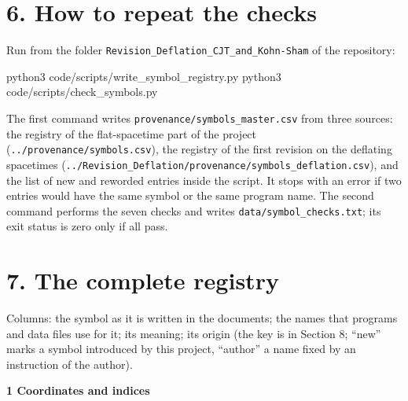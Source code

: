 \documentclass[
  10pt,
]{article}
\newenvironment{Shaded}{}{}
\newcommand{\ExtensionTok}[1]{#1}
\newcommand{\NormalTok}[1]{#1}
\begin{document}
\hypertarget{how-to-repeat-the-checks}{%
\section{6. How to repeat the checks}\label{how-to-repeat-the-checks}}

Run from the folder \texttt{Revision\_Deflation\_CJT\_and\_Kohn-Sham} of
the repository:

\begin{Shaded}
\begin{Highlighting}[]
\ExtensionTok{python3}\NormalTok{ code/scripts/write\_symbol\_registry.py}
\ExtensionTok{python3}\NormalTok{ code/scripts/check\_symbols.py}
\end{Highlighting}
\end{Shaded}

The first command writes \texttt{provenance/symbols\_master.csv} from
three sources: the registry of the flat-spacetime part of the project
(\texttt{../provenance/symbols.csv}), the registry of the first revision
on the deflating spacetimes
(\texttt{../Revision\_Deflation/provenance/symbols\_deflation.csv}), and
the list of new and reworded entries inside the script. It stops with an
error if two entries would have the same symbol or the same program
name. The second command performs the seven checks and writes
\texttt{data/symbol\_checks.txt}; its exit status is zero only if all
pass.

\hypertarget{the-complete-registry}{%
\section{7. The complete registry}\label{the-complete-registry}}

Columns: the symbol as it is written in the documents; the names that
programs and data files use for it; its meaning; its origin (the key is
in Section 8; ``new'' marks a symbol introduced by this project,
``author'' a name fixed by an instruction of the author).

\textbf{1 Coordinates and indices}
\end{document}
